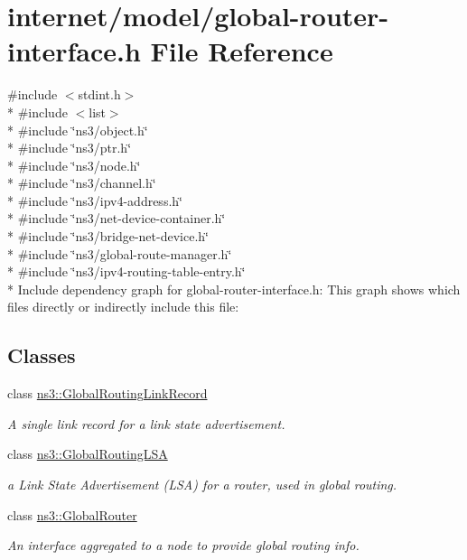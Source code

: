 \hypertarget{global-router-interface_8h}{}\section{internet/model/global-\/router-\/interface.h File Reference}
\label{global-router-interface_8h}
{\ttfamily \#include $<$stdint.\+h$>$}\\*
{\ttfamily \#include $<$list$>$}\\*
{\ttfamily \#include \char`\"{}ns3/object.\+h\char`\"{}}\\*
{\ttfamily \#include \char`\"{}ns3/ptr.\+h\char`\"{}}\\*
{\ttfamily \#include \char`\"{}ns3/node.\+h\char`\"{}}\\*
{\ttfamily \#include \char`\"{}ns3/channel.\+h\char`\"{}}\\*
{\ttfamily \#include \char`\"{}ns3/ipv4-\/address.\+h\char`\"{}}\\*
{\ttfamily \#include \char`\"{}ns3/net-\/device-\/container.\+h\char`\"{}}\\*
{\ttfamily \#include \char`\"{}ns3/bridge-\/net-\/device.\+h\char`\"{}}\\*
{\ttfamily \#include \char`\"{}ns3/global-\/route-\/manager.\+h\char`\"{}}\\*
{\ttfamily \#include \char`\"{}ns3/ipv4-\/routing-\/table-\/entry.\+h\char`\"{}}\\*
Include dependency graph for global-\/router-\/interface.h\+:
This graph shows which files directly or indirectly include this file\+:
\subsection*{Classes}
\begin{DoxyCompactItemize}
\item 
class \hyperlink{classns3_1_1GlobalRoutingLinkRecord}{ns3\+::\+Global\+Routing\+Link\+Record}
\begin{DoxyCompactList}\small\item\em A single link record for a link state advertisement. \end{DoxyCompactList}\item 
class \hyperlink{classns3_1_1GlobalRoutingLSA}{ns3\+::\+Global\+Routing\+L\+SA}
\begin{DoxyCompactList}\small\item\em a Link State Advertisement (L\+SA) for a router, used in global routing. \end{DoxyCompactList}\item 
class \hyperlink{classns3_1_1GlobalRouter}{ns3\+::\+Global\+Router}
\begin{DoxyCompactList}\small\item\em An interface aggregated to a node to provide global routing info. \end{DoxyCompactList}\end{DoxyCompactItemize}
